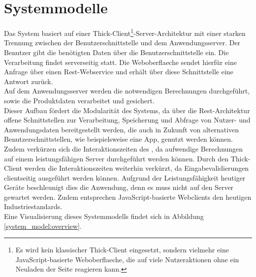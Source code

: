 \section{Systemmodelle}
Das System basiert auf einer Thick-Client\footnote{Es wird kein klassischer Thick-Client eingesetzt, sondern vielmehr eine JavaScript-basierte \gls{Weboberflaeche}, die auf viele Nutzeraktionen ohne ein Neuladen der Seite reagieren kann.}-Server-Architektur mit einer starken Trennung zwischen der Benutzerschnittstelle und dem Anwendungsserver. Der \gls{Benutzer} gibt die benötigten Daten über die Benutzerschnittstelle ein. Die Verarbeitung findet serverseitig statt. Die \gls{Weboberflaeche} sendet hierfür eine Anfrage über einen \gls{Rest}-\gls{Webservice} und erhält über diese Schnittstelle eine Antwort zurück. \\
Auf dem Anwendungsserver werden die notwendigen Berechnungen durchgeführt, sowie die Produktdaten verarbeitet und gesichert. \\
Dieser Aufbau fördert die Modularität des Systems, da über die \gls{Rest}-Architektur offene Schnittstellen zur Verarbeitung, Speicherung und Abfrage von Nutzer- und Anwendungsdaten bereitgestellt werden, die auch in Zukunft von alternativen Benutzerschnittstellen, wie beispielsweise eine App, genutzt werden können. Zudem verkürzen sich die Interaktionszeiten des , da aufwendige Berechnungen auf einem leistungsfähigen Server durchgeführt werden können. Durch den Thick-Client werden die Interaktionszeiten weiterhin verkürzt, da Eingabevalidierungen clientseitig ausgeführt werden können. Aufgrund der Leistungsfähigkeit heutiger Geräte beschleunigt dies die Anwendung, denn es muss nicht auf den Server gewartet werden. Zudem entsprechen JavaScript-basierte Webclients den heutigen Industriestandards. \\
Eine Visualisierung dieses Systemmodells findet sich in Abbildung \ref{system_model:overview}.